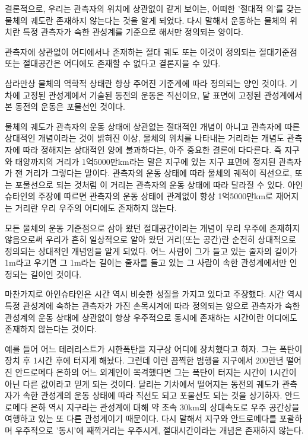 결론적으로, 우리는 관측자의 위치에 상관없이 같게 보이는, 어떠한 '절대적 의'를 갖는
물체의 궤도란 존재하지 않는다는 것을 알게 되었다. 다시 말해서 운동하는 물체의 위치란 특정
관측자가 속한 관성계를 기준으로 해서만 정의되는 양이다.

\beginbf
  관측자에 상관없이 어디에서나 존재하는 절대 궤도 또는 이것이 정의되는 절대기준점 또는
절대공간은 어디에도 존재할  수 없다고 결론지을 수 있다.
\endbf

삼라만상 물체의 역학적 상태란 항상 주어진 기준계에 따라 정의되는 양인 것이다. 기차에
고정된 관성계에서 기술된 동전의 운동은 직선이요, 달 표면에 고정된  관성계에서 본 동전의
운동은 포물선인 것이다.

물체의 궤도가 관측자의 운동 상태에 상관없는 절대적인 개념이 아니고 관측자에 따른
상대적인 개념이라는 것이 밝혀진  이상, 물체의 위치를 나타내는 거리라는 개념도 관측자에
따라 정해지는 상대적인 양에 불과하다는, 아주 중요한 결론에 다다른다. 즉 지구와 태양까지의
거리가 1억5000만km라는 말은 지구에 있는 지구 표면에 정지된 관측자가 잰 거리가 그렇다는
말이다. 관측자의 운동 상태에 따라 물체의 궤적이 직선으로, 또는 포물선으로 되는 것처럼 이
거리는 관측자의 운동 상태에 따라 달라질 수 있다. 아인슈타인의 주장에 따르면 관측자의
운동 상태에 관계없이 항상 1억5000만km로 재어지는 거리란 우리 우주의 어디에도 존재하지
않는다.

모든 물체의 운동 기준점으로 삼아 왔던 절대공간이라는 개념이 우리 우주에 존재하지
않음으로써 우리가 흔히 일상적으로 알아 왔던 거리(또는 공간)란 순전히 상대적으로 정의되는
상대적인 개념임을 알게 되었다. 어느 사람이 그가 들고 있는 줄자의 길이가 1m라고 우기면 그
1m라는 길이는 줄자를 들고 있는 그 사람이 속한 관성계에서만 인정되는 길이인 것이다.

마찬가지로 아인슈타인은 시간 역시 비슷한 성질을 가지고 있다고 주장했다. 시간 역시 특정
관성계에 속하는 관측자가 가진 손목시계에 따라 정의되는 양으로 관측자가 속한  관성계의
운동 상태에 상관없이 항상 우주적으로 동시에 존재하는 시간이란 어디에도 존재하지 않는다는
것이다.

예를 들어 어느 테러리스트가 시한폭탄을 지구상 어디에 장치했다고 하자. 그는 폭탄이
장치 후 1시간 후에 터지게 해놨다. 그런데 이런 끔찍한 범행을 지구에서 200만년 떨어진
안드로메다 은하의 어느 외계인이 목격했다면 그는 폭탄이 터지는 시간이 1시간이 아닌 다른
값이라고 믿게 되는 것이다. 달리는 기차에서 떨어지는 동전의 궤도가 관측자가 속한
관성계의 운동 상태에 따라 직선도 되고 포물선도 되는 것을 상기하자. 안드로메다 은하 역시
지구라는 관성계에 대해 약 초속 30km의 상대속도로 우주 공간상을 여행하고 있는 또 다른
관성계이기 때문이다. 다시 말해서 지구와 안드로메다를 포괄하며 우주적으로 '동시'에
째깍거리는 우주시계, 절대시간이라는  개념은 존재하지 않는다.

